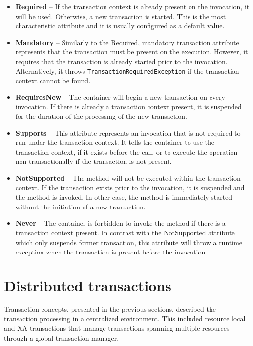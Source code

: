 \documentclass[oneside,
  digital, %
  table,   %
  lof,     %
  lot,     %
]{fithesis3}
\begin{document}
\begin{itemize}
    \item \textbf{Required} -- If the transaction context is already present on the invocation, it will be used. Otherwise, a new transaction is started. This is the most characteristic attribute and it is usually configured as a default value.
    
    \item \textbf{Mandatory} -- Similarly to the Required, mandatory transaction attribute represents that the transaction must be present on the execution. However, it requires that the transaction is already started prior to the invocation. Alternatively, it throws \texttt{TransactionRequiredException} if the transaction context cannot be found.
    
    \item \textbf{RequiresNew} -- The container will begin a new transaction on every invocation. If there is already a transaction context present, it is suspended for the duration of the processing of the new transaction. 
    
    \item \textbf{Supports} -- This attribute represents an invocation that is not required to run under the transaction context. It tells the container to use the transaction context, if it exists before the call, or to execute the operation non-transactionally if the transaction is not present.
    
    \item \textbf{NotSupported} -- The method will not be executed within the transaction context. If the transaction exists prior to the invocation, it is suspended and the method is invoked. In other case, the method is immediately started without the initiation of a new transaction.
    
    \item \textbf{Never} -- The container is forbidden to invoke the method if there is a transaction context present. In contrast with the NotSupported attribute which only suspends former transaction, this attribute will throw a runtime exception when the transaction is present before the invocation.
\end{itemize}

\section{Distributed transactions}

Transaction concepts, presented in the previous sections, described the transaction processing in a centralized environment. This included resource local and XA transactions that manage transactions spanning multiple resources through a global transaction manager.
\end{document}
